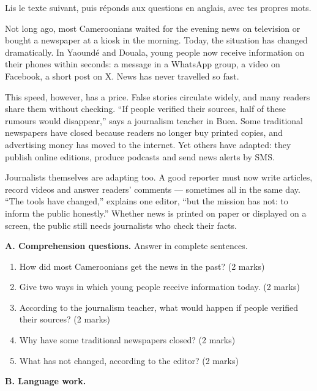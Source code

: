 \documentclass[11pt]{article}
\begin{document}
\begin{exercice}
Lis le texte suivant, puis réponds aux questions en anglais, avec tes propres mots.

\begin{textebox}
Not long ago, most Cameroonians waited for the evening news on television or bought a newspaper at a kiosk in the morning. Today, the situation has changed dramatically. In Yaoundé and Douala, young people now receive information on their phones within seconds: a message in a WhatsApp group, a video on Facebook, a short post on X. News has never travelled so fast.

This speed, however, has a price. False stories circulate widely, and many readers share them without checking. “If people verified their sources, half of these rumours would disappear,” says a journalism teacher in Buea. Some traditional newspapers have closed because readers no longer buy printed copies, and advertising money has moved to the internet. Yet others have adapted: they publish online editions, produce podcasts and send news alerts by SMS.

Journalists themselves are adapting too. A good reporter must now write articles, record videos and answer readers' comments — sometimes all in the same day. “The tools have changed,” explains one editor, “but the mission has not: to inform the public honestly.” Whether news is printed on paper or displayed on a screen, the public still needs journalists who check their facts.
\end{textebox}

\textbf{A. Comprehension questions.} Answer in complete sentences.

\begin{enumerate}
\item How did most Cameroonians get the news in the past? (2 marks)
\item Give two ways in which young people receive information today. (2 marks)
\item According to the journalism teacher, what would happen if people verified their sources? (2 marks)
\item Why have some traditional newspapers closed? (2 marks)
\item What has not changed, according to the editor? (2 marks)
\end{enumerate}

\textbf{B. Language work.}


\end{exercice}
\end{document}
